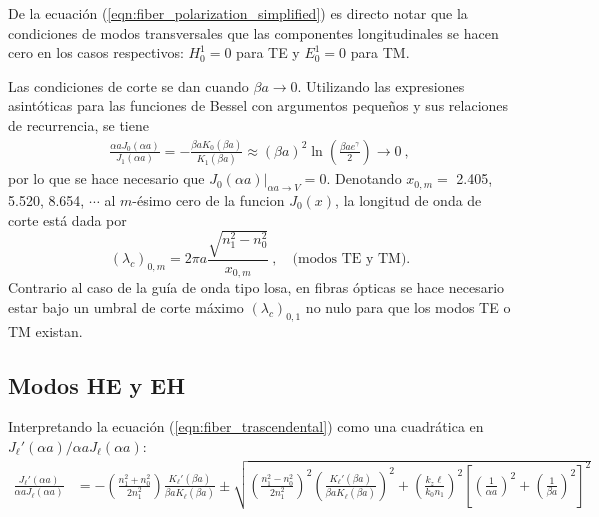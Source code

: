 De la ecuación (\ref{eqn:fiber_polarization_simplified}) es directo notar que la condiciones de modos transversales que las componentes longitudinales se hacen cero en los casos respectivos: $H_0^1 = 0$ para TE y $E_0^1 = 0$ para TM.

Las condiciones de corte se dan cuando $\beta a \to 0$. Utilizando las expresiones asintóticas para las funciones de Bessel con argumentos pequeños y sus relaciones de recurrencia, se tiene
\begin{align*}
	\frac{\alpha a J_0(\alpha a)}{J_1(\alpha a)}  = -\frac{\beta a K_{0}(\beta a)} {K_1(\beta a)} \approx (\beta a)^2\ln\left(\frac{\beta a e^\gamma}{2}\right) \to 0 \ ,
\end{align*}
por lo que se hace necesario que $\left. J_0(\alpha a)\right|_{\alpha a \to V} = 0$. Denotando $x_{0,m}=$ 2.405,  5.520,  8.654, $\cdots$ al $m$-ésimo cero de la funcion $J_0(x)$, la longitud de onda de corte está dada por 
\begin{equation}
(\lambda_c)_{0,m} = 2\pi a \frac{\sqrt{n_1^2 - n_0^2}}{x_{0,m}} \ , \quad\text{(modos TE y TM).}
\end{equation} 
Contrario al caso de la guía de onda tipo losa, en fibras ópticas se hace necesario estar bajo un umbral de corte máximo $(\lambda_c)_{0,1}$ no nulo para que los modos TE o TM existan.


\subsection{Modos HE y EH}
Interpretando la ecuación (\ref{eqn:fiber_trascendental}) como una cuadrática en $J_\ell'(\alpha a)/\alpha a J_\ell(\alpha a)$:
\begin{align*}
	\frac{J_\ell'(\alpha a)}{\alpha a J_\ell(\alpha a)} &= -\left(\frac{n_1^2+n_0^2}{2n_1^2}\right) \frac{K_\ell'(\beta a)}{\beta a K_\ell(\beta a)}\pm\sqrt{\left(\frac{n_1^2-n_0^2}{2n_1^2}\right)^2\left(\frac{K_\ell'(\beta a)}{\beta a K_\ell(\beta a)}\right)^2+ \left( \frac{ k_z \ell}{ k_0 n_1} \right)^2\left[ \left(\frac{1}{\alpha a}\right)^2 + \left(\frac{1}{\beta a}\right)^2 \right]^2 }
\end{align*}

